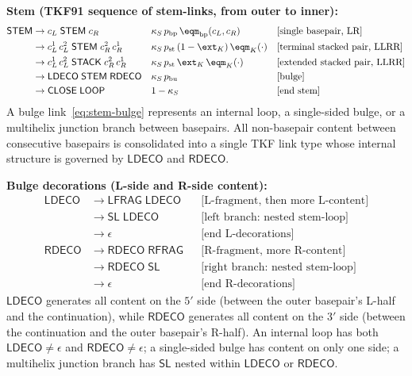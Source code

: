 \noindent\textbf{Stem (TKF91 sequence of stem-links, from outer to inner):}
\begin{align}
\mathsf{STEM} &\to c_L\;\mathsf{STEM}\;c_R
  && \kappa_S\, p_{\mathrm{bp}}\, \eqm_{\mathrm{bp}}(c_L, c_R)
  && \text{[single basepair, LR]}
  \label{eq:stem-bp} \\
&\to c_L^1\, c_L^2\;\mathsf{STEM}\;c_R^2\, c_R^1
  && \kappa_S\, p_{\mathrm{st}}\, (1-\ext_K)\, \eqm_K(\cdot)
  && \text{[terminal stacked pair, LLRR]}
  \label{eq:stem-stack-term} \\
&\to c_L^1\, c_L^2\;\mathsf{STACK}\;c_R^2\, c_R^1
  && \kappa_S\, p_{\mathrm{st}}\, \ext_K\, \eqm_K(\cdot)
  && \text{[extended stacked pair, LLRR]}
  \label{eq:stem-stack-ext} \\
&\to \mathsf{LDECO}\;\mathsf{STEM}\;\mathsf{RDECO}
  && \kappa_S\, p_{\mathrm{bu}}
  && \text{[bulge]}
  \label{eq:stem-bulge} \\
&\to \mathsf{CLOSE}\;\mathsf{LOOP}
  && 1 - \kappa_S
  && \text{[end stem]}
  \label{eq:stem-end}
\end{align}
A bulge link~\eqref{eq:stem-bulge} represents an internal loop,
a single-sided bulge, or a multihelix junction branch between
basepairs.
All non-basepair content between consecutive basepairs is
consolidated into a single TKF link type whose internal structure
is governed by $\mathsf{LDECO}$ and $\mathsf{RDECO}$.

\medskip
\noindent\textbf{Bulge decorations (L-side and R-side content):}
\begin{align}
\mathsf{LDECO} &\to \mathsf{LFRAG}\;\mathsf{LDECO}
  && \text{[L-fragment, then more L-content]}
  \label{eq:ldeco-lfrag} \\
&\to \mathsf{SL}\;\mathsf{LDECO}
  && \text{[left branch: nested stem-loop]}
  \label{eq:ldeco-branch} \\
&\to \epsilon
  && \text{[end L-decorations]}
  \label{eq:ldeco-end} \\[6pt]
\mathsf{RDECO} &\to \mathsf{RDECO}\;\mathsf{RFRAG}
  && \text{[R-fragment, more R-content]}
  \label{eq:rdeco-rfrag} \\
&\to \mathsf{RDECO}\;\mathsf{SL}
  && \text{[right branch: nested stem-loop]}
  \label{eq:rdeco-branch} \\
&\to \epsilon
  && \text{[end R-decorations]}
  \label{eq:rdeco-end}
\end{align}
$\mathsf{LDECO}$ generates all content on the $5'$ side
(between the outer basepair's L-half and the continuation),
while $\mathsf{RDECO}$ generates all content on the $3'$ side
(between the continuation and the outer basepair's R-half).
An internal loop has both $\mathsf{LDECO} \neq \epsilon$ and
$\mathsf{RDECO} \neq \epsilon$;
a single-sided bulge has content on only one side;
a multihelix junction branch has $\mathsf{SL}$ nested within
$\mathsf{LDECO}$ or $\mathsf{RDECO}$.

